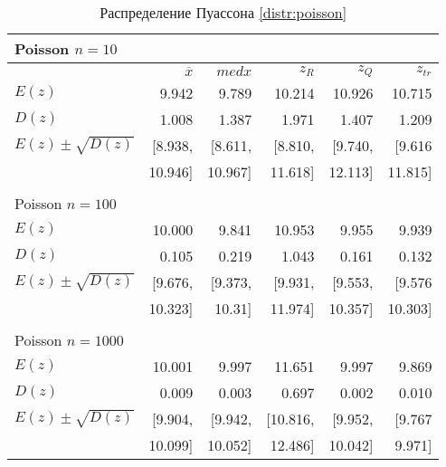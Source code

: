 \documentclass[a4paper]{article}
\begin{document}
\begin{table}[H]
	\centering
	\begin{tabular}[t]{|l|r|r|r|r|r|}
		\hline
		Poisson $n = 10$ & & & & & \\
		\hline
		& $\overline{x}$ & $med x$ &       $z_R$ &      $z_Q$ &      $z_{tr}$ \\
		\hline
		$E(z)$   & 9.942 & 9.789 & 10.214 & 10.926 & 10.715\\
		\hline
		$D(z)$   & 1.008 & 1.387 & 1.971 & 1.407 & 1.209\\
		\hline
		$E(z) \pm \sqrt{D(z)}$ & [8.938, &[8.611, &[8.810, &[9.740,  &[9.616\\
		&10.946]& 10.967]& 11.618]& 12.113]& 11.815]\\
		\hline
		& & & & & \\
		\hline 
		Poisson $n = 100$ & & & & & \\
		\hline
		$E(z)$ & 10.000 & 9.841 & 10.953 & 9.955 & 9.939\\
		\hline
		$D(z)$ & 0.105 & 0.219 & 1.043 & 0.161 & 0.132\\
		\hline
		$E(z) \pm \sqrt{D(z)}$ & [9.676, &[9.373, &[9.931, &[9.553, &[9.576\\
		& 10.323]& 10.31]& 11.974]& 10.357]& 10.303]\\
		\hline
		& & & & & \\
		\hline 
		Poisson $n = 1000$ & & & & & \\
		\hline
		$E(z)$ & 10.001 & 9.997 & 11.651 & 9.997 & 9.869\\
		\hline
		$D(z)$ & 0.009 & 0.003 & 0.697 & 0.002 & 0.010\\
		\hline
		$E(z) \pm \sqrt{D(z)}$ & [9.904, &[9.942, &[10.816, &[9.952,  &[9.767\\
		& 10.099]& 10.052]& 12.486]& 10.042]& 9.971]\\
		\hline
	\end{tabular}
	\caption{Распределение Пуассона \eqref{distr:poisson}}
	\label{table:poisson}
\end{table}
\end{document}
